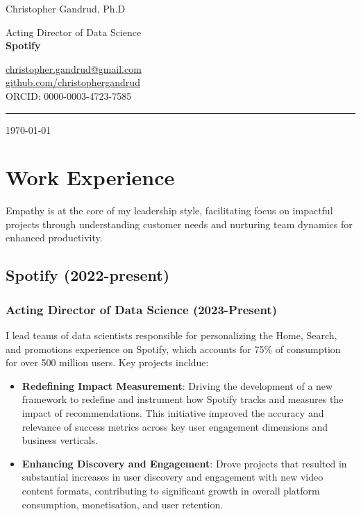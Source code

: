 \documentclass[a4paper]{article}
\begin{document}
\begin{flushright}
    {\huge Christopher Gandrud, Ph.D} \\
    \vspace{0.251cm}

    Acting Director of Data Science \\
    {\bf{\large Spotify}} \\
    \vspace{0.25cm}

    \href{mailto:christopher.gandrud@gmail.com}{christopher.gandrud@gmail.com} \\
    \href{https://github.com/christophergandrud}{github.com/christophergandrud} \\
    ORCID: 0000-0003-4723-7585 \\
    \medskip\hrule height 1pt

    \vspace{0.5cm}
    \today
\end{flushright}

\vspace{0.5cm}

\section*{Work Experience}

\noindent Empathy is at the core of my leadership style, facilitating focus on impactful projects through understanding customer needs and nurturing team dynamics for enhanced productivity.

\subsection*{Spotify (2022-present)}

\subsubsection*{Acting Director of Data Science (2023-Present)}

I lead teams of data scientists responsible for personalizing the Home, Search, and promotions experience on Spotify, which accounts for 75\% of consumption for over 500 million users. Key projects incldue: \\

\begin{itemize}
    \item \textbf{Redefining Impact Measurement}: Driving the development of a new framework to redefine and instrument how Spotify tracks and measures the impact of recommendations. This initiative improved the accuracy and relevance of success metrics across key user engagement dimensions and business verticals.
    \item \textbf{Enhancing Discovery and Engagement}: Drove projects that resulted in substantial increases in user discovery and engagement with new video content formats, contributing to significant growth in overall platform consumption, monetisation, and user retention.
\end{itemize}
\end{document}
